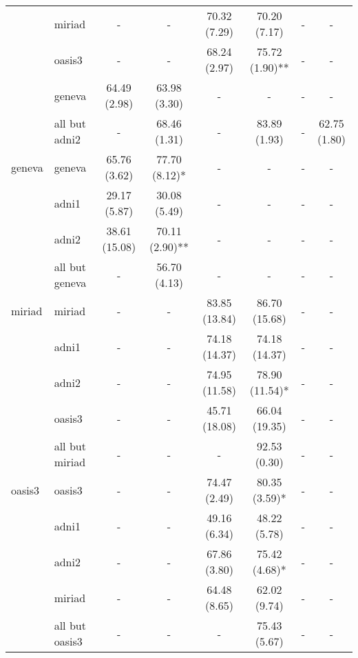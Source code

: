 \begin{table*}
{\begin{tabular}{llcccccc}
       & miriad         &              - &             - &   70.32 (7.29) &   70.20 (7.17) &             - &             - \\
       & oasis3         &              - &             - &   68.24 (2.97) &   75.72 (1.90)** &             - &             - \\
       & geneva         &   64.49 (2.98) &  63.98 (3.30) &              - &              - &             - &             - \\
       & all but adni2  &              - &  68.46 (1.31) &   - &   83.89 (1.93) &  - &  62.75 (1.80) \\
\midrule
geneva & geneva         &   65.76 (3.62) &  77.70 (8.12)* &              - &              - &             - &             - \\
       & adni1          &   29.17 (5.87) &  30.08 (5.49) &              - &              - &             - &             - \\
       & adni2          &  38.61 (15.08) &  70.11 (2.90)** &              - &              - &             - &             - \\
       & all but geneva &              - &  56.70 (4.13) &              - &              - &             - &             - \\
\midrule
miriad & miriad         &              - &             - &  83.85 (13.84) &  86.70 (15.68) &             - &             - \\
       & adni1          &              - &             - &  74.18 (14.37) &  74.18 (14.37) &             - &             - \\
       & adni2          &              - &             - &  74.95 (11.58) &  78.90 (11.54)* &             - &             - \\
       & oasis3         &              - &             - &  45.71 (18.08) &  66.04 (19.35) &             - &             - \\
       & all but miriad &              - &             - &  - &   92.53 (0.30) &             - &             - \\
\midrule
oasis3 & oasis3         &              - &             - &   74.47 (2.49) &   80.35 (3.59)* &             - &             - \\
       & adni1          &              - &             - &   49.16 (6.34) &   48.22 (5.78) &             - &             - \\
       & adni2          &              - &             - &   67.86 (3.80) &   75.42 (4.68)* &             - &             - \\
       & miriad         &              - &             - &   64.48 (8.65) &   62.02 (9.74) &             - &             - \\
       & all but oasis3 &              - &             - &   - &   75.43 (5.67) &             - &             - \\
\bottomrule
\end{tabular}}
\end{table*}
